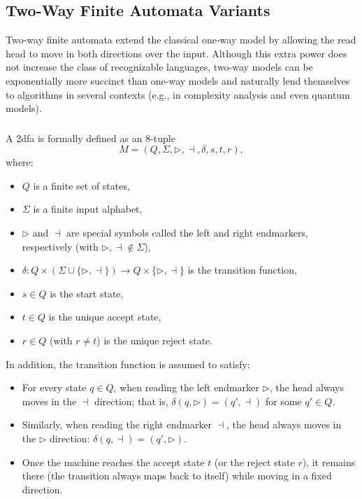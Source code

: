 \subsection{Two-Way Finite Automata Variants}
\label{subsec:two-way-variants}

Two-way finite automata extend the classical one‐way model by allowing the read head to move in both directions over the input. Although this extra power does not increase the class of recognizable languages, two-way models can be exponentially more succinct than one-way models \cite{sakoda1978nfas, kozen1997automata} and naturally lend themselves to algorithms in several contexts (e.g., in complexity analysis and even quantum models).

\subsubsection{}
\label{subsubsec:2dfa}

\begin{definition}
A \gls{2dfa} is formally defined as an 8-tuple 
\[
M = (Q, \Sigma, \triangleright, \dashv, \delta, s, t, r),
\]
where:
\begin{itemize}
  \item \(Q\) is a finite set of states,
  \item \(\Sigma\) is a finite input alphabet,
  \item \(\triangleright\) and \(\dashv\) are special symbols called the left and right endmarkers, respectively (with \(\triangleright,\dashv \notin \Sigma\)),
  \item \(\delta: Q \times (\Sigma \cup \{\triangleright, \dashv\}) \to Q \times \{\triangleright,\dashv\}\) is the transition function,
  \item \(s\in Q\) is the start state,
  \item \(t\in Q\) is the unique accept state,
  \item \(r\in Q\) (with \(r\neq t\)) is the unique reject state.
\end{itemize}
In addition, the transition function is assumed to satisfy:
\begin{itemize}
  \item For every state \(q\in Q\), when reading the left endmarker \(\triangleright\), the head always moves in the \(\dashv\) direction; that is, \(\delta(q,\triangleright) = (q', \dashv)\) for some \(q'\in Q\).
  \item Similarly, when reading the right endmarker \(\dashv\), the head always moves in the \(\triangleright\) direction: \(\delta(q,\dashv) = (q', \triangleright)\).
  \item Once the machine reaches the accept state \(t\) (or the reject state \(r\)), it remains there (the transition always maps back to itself) while moving in a fixed direction.
\end{itemize}
\end{definition}

